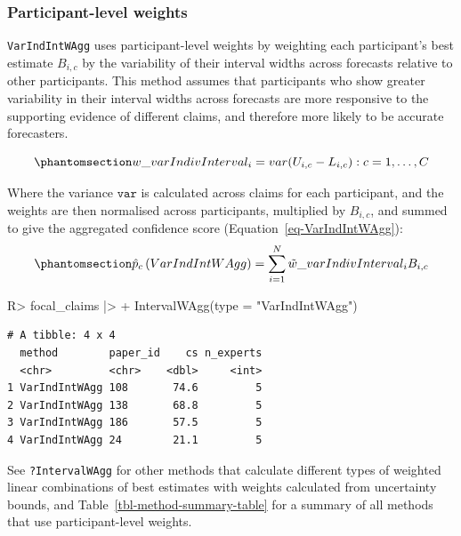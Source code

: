 \documentclass[
  11pt,
  a4paper,
]{article}
\newenvironment{Shaded}{\begin{snugshade}}{\end{snugshade}}
\newcommand{\AttributeTok}[1]{\textcolor[rgb]{0.40,0.45,0.13}{#1}}
\newcommand{\FunctionTok}[1]{\textcolor[rgb]{0.28,0.35,0.67}{#1}}
\newcommand{\NormalTok}[1]{\textcolor[rgb]{0.00,0.23,0.31}{#1}}
\newcommand{\SpecialCharTok}[1]{\textcolor[rgb]{0.37,0.37,0.37}{#1}}
\newcommand{\StringTok}[1]{\textcolor[rgb]{0.13,0.47,0.30}{#1}}
\begin{document}
\subsubsection{Participant-level
weights}\label{participant-level-weights}

\texttt{VarIndIntWAgg} uses participant-level weights by weighting each
participant's best estimate \(B_{i,c}\) by the variability of their
interval widths across forecasts relative to other participants. This
method assumes that participants who show greater variability in their
interval widths across forecasts are more responsive to the supporting
evidence of different claims, and therefore more likely to be accurate
forecasters.

\begin{equation}\protect\phantomsection\label{eq-weightVarIndInt}{
w\_varIndivInterval_{i}= var{(U_{i,c} - L_{i,c}): c = 1,\dots, C}
}\end{equation}

Where the variance \(\texttt{var}\) is calculated across claims for each
participant, and the weights are then normalised across participants,
multiplied by \(B_{i,c}\), and summed to give the aggregated confidence
score (Equation~\ref{eq-VarIndIntWAgg}):
\begin{equation}\protect\phantomsection\label{eq-VarIndIntWAgg}{
\hat{p}_c\left( VarIndIntWAgg \right) = \sum_{i=1}^N \tilde{w}\_varIndivInterval_{i}B_{i,c}
}\end{equation}

\begin{Shaded}
\begin{Highlighting}[]
\NormalTok{R}\SpecialCharTok{\textgreater{}}\NormalTok{ focal\_claims }\SpecialCharTok{|\textgreater{}}
\SpecialCharTok{+}    \FunctionTok{IntervalWAgg}\NormalTok{(}\AttributeTok{type =} \StringTok{"VarIndIntWAgg"}\NormalTok{)}
\end{Highlighting}
\end{Shaded}

\begin{verbatim}
# A tibble: 4 x 4
  method        paper_id    cs n_experts
  <chr>         <chr>    <dbl>     <int>
1 VarIndIntWAgg 108       74.6         5
2 VarIndIntWAgg 138       68.8         5
3 VarIndIntWAgg 186       57.5         5
4 VarIndIntWAgg 24        21.1         5
\end{verbatim}

See \texttt{?IntervalWAgg} for other methods that calculate different
types of weighted linear combinations of best estimates with weights
calculated from uncertainty bounds, and
Table~\ref{tbl-method-summary-table} for a summary of all methods that
use participant-level weights.
\end{document}
